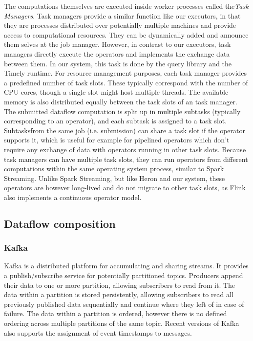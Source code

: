The computations themselves are executed inside worker processes called
the\emph{Task Managers}. Task managers provide a similar function like our executors, in that
they are processes distributed over potentially multiple machines and provide access to
computational resources. They can be dynamically added and announce them selves at the
job manager. However, in contrast to our executors, task managers directly execute the
operators and implements the exchange data between them. In our system, this task is done by the
query library and the Timely runtime. For resource management purposes, each task manager provides
a predefined number of task slots. These typically correspond with the number of CPU cores,
though a single slot might host multiple threads. The available memory is also distributed
equally between the task slots of an task manager. The submitted dataflow computation is split up
in multiple subtasks (typically corresponding to an operator), and each subtask is assigned
to a task slot. Subtasksfrom the same job (i.e. submission) can share a task slot
if the operator supports it, which is useful for example for pipelined operators which don't
require any exchange of data with operators running in other task slots.
Because task managers can have multiple task slots, they can run operators from different
computations within the same operating system process, similar to Spark Streaming. Unlike
Spark Streaming, but like Heron and our system, these operators are however long-lived
and do not migrate to other task slots, as Flink also implements a continuous operator model.

\subsection{Dataflow composition}

\subsubsection{Kafka}

Kafka \cite{kafka} is a distributed platform for accumulating and sharing streams. It provides
a publish/subscribe service for potentially partitioned topics. Producers append
their data to one or more partition, allowing subscribers to read from it.
The data within a partition is stored persistently, allowing subscribers to
read all previously published data sequentially and continue where they left
of in case of failure. The data within a partition is ordered, however there
is no defined ordering across multiple partitions of the same topic. Recent
versions of Kafka also supports the assignment of event timestamps to messages.


